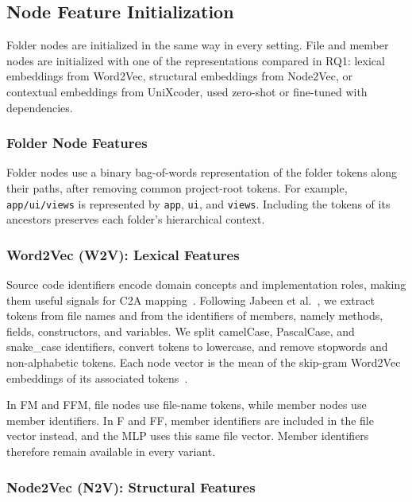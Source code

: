 \subsection{Node Feature Initialization \label{sec:node_features}}

Folder nodes are initialized in the same way in every setting. File and member nodes are initialized with one of the representations compared in RQ1: lexical embeddings from Word2Vec, structural embeddings from Node2Vec, or contextual embeddings from UniXcoder, used zero-shot or fine-tuned with dependencies.

\subsubsection{Folder Node Features}

Folder nodes use a binary bag-of-words representation of the folder tokens along their paths, after removing common project-root tokens. For example, \texttt{app/ui/views} is represented by \texttt{app}, \texttt{ui}, and \texttt{views}. Including the tokens of its ancestors preserves each folder's hierarchical context.

\subsubsection{Word2Vec (W2V): Lexical Features\label{sec:node_w2v}}

Source code identifiers encode domain concepts and implementation roles, making them useful signals for C2A mapping~\cite{sarif}. Following Jabeen et al.~\citep{gaer}, we extract tokens from file names and from the identifiers of members, namely methods, fields, constructors, and variables. We split camelCase, PascalCase, and snake\_case identifiers, convert tokens to lowercase, and remove stopwords and non-alphabetic tokens. Each node vector is the mean of the skip-gram Word2Vec embeddings of its associated tokens~\cite{word2vec}.

In FM and FFM, file nodes use file-name tokens, while member nodes use member identifiers. In F and FF, member identifiers are included in the file vector instead, and the MLP uses this same file vector. Member identifiers therefore remain available in every variant.

\subsubsection{Node2Vec (N2V): Structural Features \label{sec:node_n2v}}

